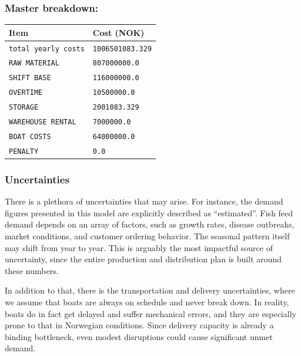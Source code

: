 \documentclass[10pt]{article}
\begin{document}
\subsubsection{Master breakdown:}

\begin{center}
    \begin{tabular}{|l|l|}
        \hline 
        \textbf{Item} & \textbf{Cost (NOK)}\\\hline 
        \verb|total yearly costs| & \verb|1006501083.329| \\\hline 
        \verb|RAW MATERIAL| &   \verb|807000000.0| \\\hline 
        \verb|SHIFT BASE| &     \verb|116000000.0| \\\hline 
        \verb|OVERTIME| &       \verb|10500000.0 | \\\hline 
        \verb|STORAGE| &        \verb|2001083.329| \\\hline 
        \verb|WAREHOUSE RENTAL| &       \verb|7000000.0 | \\\hline 
        \verb|BOAT COSTS| &     \verb|64000000.0 | \\\hline 
        \verb|PENALTY| &        \verb|0.0 | \\\hline 
    \end{tabular}
\end{center}

\subsubsection{Uncertainties}

There is a plethora of uncertainties that may arise. For instance, the demand figures presented in this model are explicitly described as ``estimated''. Fish feed demand depends on an array of factors, such as growth rates, disease outbreaks, market conditions, and customer ordering behavior. The seasonal pattern itself may shift from year to year. This is arguably the most impactful source of uncertainty, since the entire production and distribution plan is built around these numbers. 

In addition to that, there is the transportation and delivery uncertainties, where we assume that boats are always on schedule and never break down. In reality, boats do in fact get delayed and suffer mechanical errors, and they are especially prone to that in Norwegian conditions. Since delivery capacity is already a binding bottleneck, even modest disruptions could cause significant unmet demand. 
\end{document}
